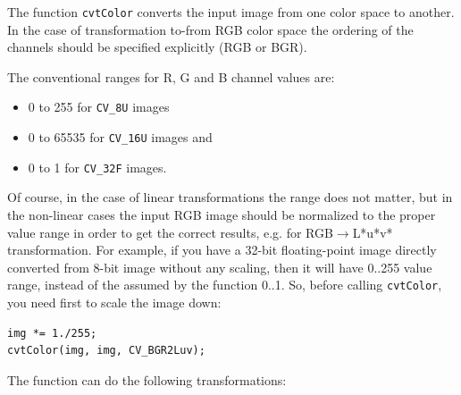 The function \texttt{cvtColor} converts the input image from one color
space to another. In the case of transformation to-from RGB color space the ordering of the channels should be specified explicitly (RGB or BGR).

The conventional ranges for R, G and B channel values are:

\begin{itemize}
 \item 0 to 255 for \texttt{CV\_8U} images
 \item 0 to 65535 for \texttt{CV\_16U} images and
 \item 0 to 1 for \texttt{CV\_32F} images.
\end{itemize}

Of course, in the case of linear transformations the range does not matter,
but in the non-linear cases the input RGB image should be normalized to the proper value range in order to get the correct results, e.g. for RGB$\rightarrow$L*u*v* transformation. For example, if you have a 32-bit floating-point image directly converted from 8-bit image without any scaling, then it will have 0..255 value range, instead of the assumed by the function 0..1. So, before calling \texttt{cvtColor}, you need first to scale the image down:
\begin{lstlisting}
img *= 1./255;
cvtColor(img, img, CV_BGR2Luv);
\end{lstlisting}

The function can do the following transformations:

